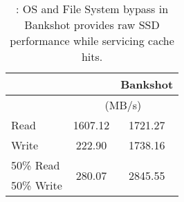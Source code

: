 \begin{table}
	\centering
	\begin{tabular}{|l|c|c|}
	\hline
	\multirow{2}{*}{}&\FlashCache{} &Bankshot\\\hline
	&\multicolumn{2}{c|}{(MB/s)}\\\hline
	Read & 1607.12 & 1721.27 \\\hline
	Write & 222.90 & 1738.16 \\\hline
	50\% Read & \multirow{2}{*}{280.07} & \multirow{2}{*}{2845.55} \\
	50\% Write& & \\\hline
	\end{tabular}
	\vspace*{3mm}
	\caption{: OS and File System bypass in Bankshot
	provides raw SSD performance while servicing cache hits.}
	\label{table:hitbw}
\end{table}


